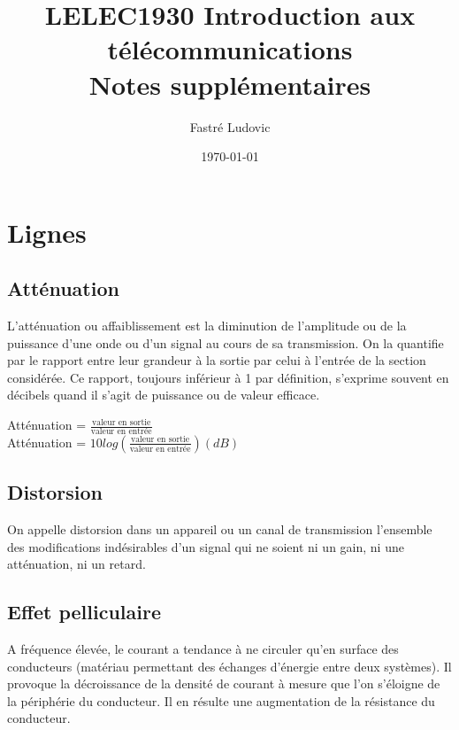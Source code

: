 \documentclass[12pt]{article}
\title{LELEC1930 \hspace{0.5cm} Introduction aux télécommunications\\ \large Notes supplémentaires}
\author{Fastré Ludovic}
\date{\today}
\begin{document}
\maketitle

\tableofcontents 

\newpage

\section{Lignes}

\subsection{Atténuation}

L’atténuation ou affaiblissement est la diminution de l'amplitude ou de la puissance d'une onde ou d'un signal au cours de sa transmission. On la quantifie par le rapport entre leur grandeur à la sortie par celui à l'entrée de la section considérée. Ce rapport, toujours inférieur à 1 par définition, s'exprime souvent en décibels quand il s'agit de puissance ou de valeur efficace.

\begin{center}
Atténuation = $\frac{\text{valeur en sortie}}{\text{valeur en entrée}}$\\
\vspace{2 mm}
Atténuation = $10log(\frac{\text{valeur en sortie}}{\text{valeur en entrée}}) (dB)$
\end{center}

\subsection{Distorsion}

On appelle distorsion dans un appareil ou un canal de transmission l'ensemble des modifications indésirables d'un signal qui ne soient ni un gain, ni une atténuation, ni un retard.

\subsection{Effet pelliculaire}

A fréquence élevée, le courant a tendance à ne circuler qu'en surface des conducteurs (matériau permettant des échanges d'énergie entre deux systèmes). Il provoque la décroissance de la densité de courant à mesure que l'on s'éloigne de la périphérie du conducteur. Il en résulte une augmentation de la résistance du conducteur.
\end{document}
